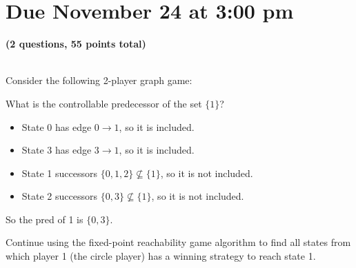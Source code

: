 \documentclass[11pt]{article}
\begin{document}
\maketitle

\section*{Due November 24 at 3:00 pm}

\textbf{(2 questions, 55 points total)}

\begin{qunlist}

  \\
  Consider the following 2-player graph game:


  \begin{qparts}
  \item
    What is the controllable predecessor of the set $\{1\}$?

    \begin{answer}

      \begin{itemize}
        \item State 0 has edge $0 \to 1$, so it is included.
        \item State 3 has edge $3 \to 1$, so it is included.
        \item State 1 successors $\{0,1,2\} \not\subseteq \{1\}$, so it is not included.
        \item State 2 successors $\{0,3\} \not\subseteq \{1\}$, so it is not included.
      \end{itemize}
      So the pred of 1 is $\{0, 3\}$.
    \end{answer}

  \item
    Continue using the fixed-point reachability game algorithm to find all states from which player 1 (the circle player) has a winning strategy to reach state 1.


\end{qparts}
\end{qunlist}
\end{document}
